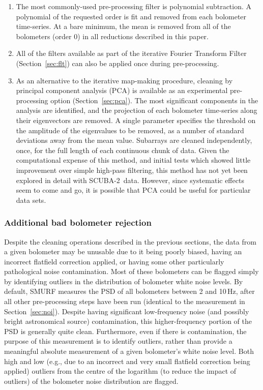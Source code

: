 \documentclass[useAMS,usenatbib,nofootinbib]{mn2e}
\newcommand{\scuba}{SCUBA-2}
\begin{document}
\begin{enumerate}

\item The most commonly-used pre-processing filter is polynomial
subtraction. A polynomial of the requested order is fit and removed
from each bolometer time-series. At a bare minimum, the mean is
removed from all of the bolometers (order 0) in all reductions
described in this paper.

\item All of the filters available as part of the iterative Fourier
Transform Filter (Section~\ref{sec:flt}) can also be applied once
during pre-processing.

\item As an alternative to the iterative map-making procedure,
cleaning by principal component analysis (PCA) is available as an
experimental pre-processing option (Section~\ref{sec:pca}). The most
significant components in the analysis are identified, and the
projection of each bolometer time-series along their eigenvectors are
removed. A single parameter specifies the threshold on the amplitude
of the eigenvalues to be removed, as a number of standard deviations
away from the mean value. Subarrays are cleaned independently, once,
for the full length of each continuous chunk of data. Given the
computational expense of this method, and initial tests which showed
little improvement over simple high-pass filtering, this method has
not yet been explored in detail with \scuba\ data. However, since
systematic effects seem to come and go, it is possible that PCA could
be useful for particular data sets.

\end{enumerate}

\subsubsection{Additional bad bolometer rejection}
\label{sec:flagbadbol}

Despite the cleaning operations described in the previous sections,
the data from a given bolometer may be unusable due to it being poorly
biased, having an incorrect flatfield correction applied, or having
some other particularly pathological noise contamination. Most of
these bolometers can be flagged simply by identifying outliers in the
distribution of bolometer white noise levels. By default, SMURF
measures the PSD of all bolometers between 2 and 10\,Hz, after all
other pre-processing steps have been run (identical to the measurement
in Section~\ref{sec:noi}). Despite having significant low-frequency
noise (and possibly bright astronomical source) contamination, this
higher-frequency portion of the PSD is generally quite
clean. Furthermore, even if there is contamination, the purpose of
this measurement is to identify outliers, rather than provide a
meaningful absolute measurement of a given bolometer's white noise
level. Both high and low (e.g., due to an incorrect and very small
flatfield correction being applied) outliers from the centre of the
logarithm (to reduce the impact of outliers) of the bolometer noise
distribution are flagged.
\end{document}
